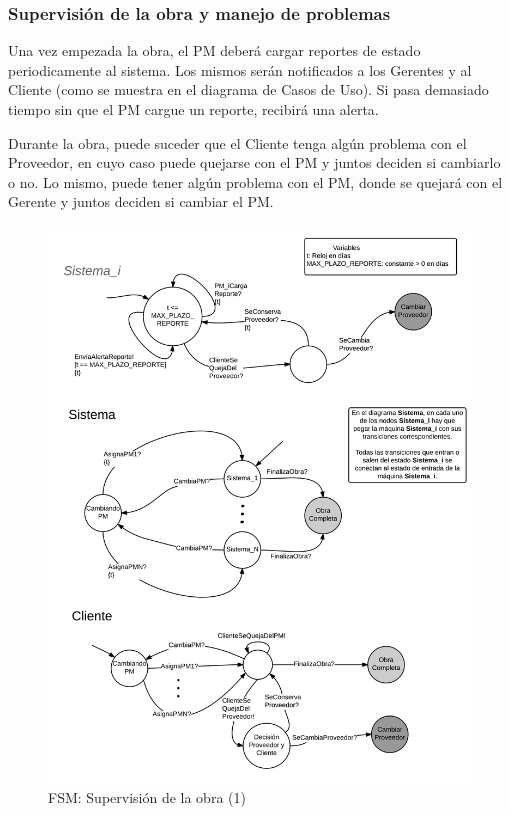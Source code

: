 		\subsubsection{Supervisión de la obra y manejo de problemas}
Una vez empezada la obra, el PM deberá cargar reportes de estado periodicamente al sistema. 
Los mismos serán notificados a los Gerentes y al Cliente (como se muestra en el diagrama 
de Casos de Uso). Si pasa demasiado tiempo sin que el PM cargue un reporte, recibirá 
una alerta. 

Durante la obra, puede suceder que el Cliente tenga algún problema con el Proveedor, 
en cuyo caso puede quejarse con el PM y juntos deciden si cambiarlo o no. 
Lo mismo, puede tener algún problema con el PM, donde se quejará con el Gerente y juntos deciden 
si cambiar el PM. 

\begin{figure}[H]
\centering
\includegraphics[width=0.8\linewidth]{diag/nuevos/fsm-obra1.png}
\caption{FSM: Supervisión de la obra (1)}
\label{fsm-firmcont1}
\end{figure}

